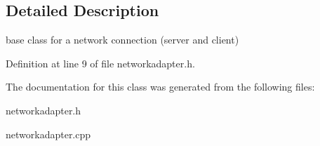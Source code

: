\subsection{Detailed Description}
base class for a network connection (server and client) 

Definition at line 9 of file networkadapter.\-h.



The documentation for this class was generated from the following files\-:\begin{DoxyCompactItemize}
\item 
networkadapter.\-h\item 
networkadapter.\-cpp\end{DoxyCompactItemize}
